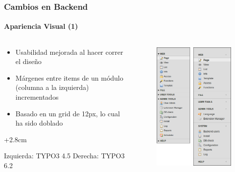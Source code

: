 
\begin{frame}[fragile]
	\frametitle{Cambios en Backend}
	\framesubtitle{Apariencia Visual (1)}

	\begin{columns}[T]

		\begin{column}{.5\textwidth}
			\begin{itemize}
				\item Usabilidad mejorada al hacer correr el diseño
				\item Márgenes entre items de un módulo (columna a la izquierda) incrementados
				\item Basado en un grid de 12px, lo cual ha sido doblado
			\end{itemize}

			\advance\leftskip+2.8cm

			\smaller
				Izquierda: TYPO3 4.5\newline
				Derecha: TYPO3 6.2
			\normalsize
		\end{column}

		\begin{column}{.5\textwidth}
			\begin{figure}\vspace*{-0.4cm}
				\includegraphics[width=0.6\linewidth]{Images/BackendChanges/VisualAppearance.png}
			\end{figure}
		\end{column}

	\end{columns}

\end{frame}

